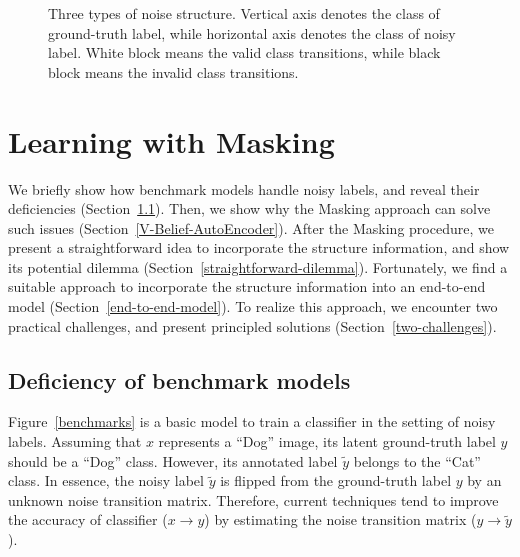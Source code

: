 \documentclass{article}
\begin{document}
\begin{figure}[!t]
\begin{center}
\hfill
{}\hfill
{}
\caption{Three types of noise structure. Vertical axis denotes the class of ground-truth label, while horizontal axis denotes the class of noisy label. White block means the valid class transitions, while black block means the invalid class transitions.}
\label{fig:tripattern}
\end{center}
\end{figure}

\section{Learning with Masking}
We briefly show how benchmark models handle noisy labels, and reveal their deficiencies (Section~\ref{deficiency}). Then, we show why the Masking approach can solve such issues (Section~\ref{V-Belief-AutoEncoder}). After the Masking procedure, we present a straightforward idea to incorporate the structure information, and show its potential dilemma (Section~\ref{straightforward-dilemma}). Fortunately, we find a suitable approach to incorporate the structure information into an end-to-end model (Section~\ref{end-to-end-model}). To realize this approach, we encounter two practical challenges, and present principled solutions (Section~\ref{two-challenges}).

\subsection{Deficiency of benchmark models}\label{deficiency}
Figure~\ref{benchmarks} is a basic model to train a classifier in the setting of noisy labels. Assuming that $x$ represents a ``Dog'' image, its latent ground-truth label $y$ should be a ``Dog'' class. However, its annotated label $\tilde{y}$ belongs to the ``Cat'' class. In essence, the noisy label $\tilde{y}$ is flipped from the ground-truth label $y$ by an unknown noise transition matrix. Therefore, current techniques tend to improve the accuracy of classifier ($x \rightarrow y$) by estimating the noise transition matrix ($y \rightarrow \tilde{y}$).
\end{document}
